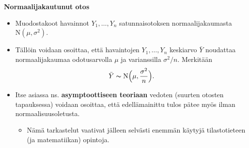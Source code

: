 \documentclass[
]{book}
\providecommand{\tightlist}{%
  \setlength{\itemsep}{0pt}\setlength{\parskip}{0pt}}
\begin{document}
\textbf{Normaalijakautunut otos}

\begin{itemize}
\item
  Muodostakoot havainnot \(Y_1, \ldots, Y_n\) satunnaisotoksen normaalijakaumasta \(\text{N}(\mu, \sigma^2)\).
\item
  Tällöin voidaan osoittaa, että havaintojen \(Y_1, \ldots, Y_n\) keskiarvo \(\bar{Y}\) noudattaa normaalijakaumaa odotusarvolla \(\mu\) ja varianssilla \(\sigma^2/n\). Merkitään
  \[
  \bar{Y} \thicksim \text{N} \Big(\mu, \frac{\sigma^2}{n} \Big).
  \]
\item
  Itse asiassa ns. \textbf{asymptoottiseen teoriaan} vedoten (suurten otosten tapauksessa) voidaan osoittaa, että edellämainittu tulos pätee myös ilman normaalisuusoletusta.

  \begin{itemize}
  \tightlist
  \item
    Nämä tarkastelut vaativat jälleen selvästi enemmän käytyjä tilastotieteen (ja matematiikan) opintoja.
  \end{itemize}
\end{itemize}
\end{document}
